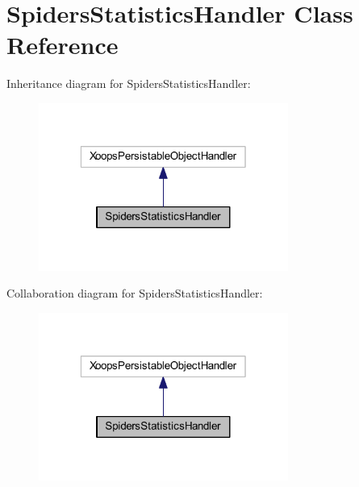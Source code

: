 \hypertarget{class_spiders_statistics_handler}{\section{Spiders\-Statistics\-Handler Class Reference}
\label{class_spiders_statistics_handler}
}


Inheritance diagram for Spiders\-Statistics\-Handler\-:
\nopagebreak
\begin{figure}[H]
\begin{center}
\leavevmode
\includegraphics[width=232pt]{class_spiders_statistics_handler__inherit__graph}
\end{center}
\end{figure}


Collaboration diagram for Spiders\-Statistics\-Handler\-:
\nopagebreak
\begin{figure}[H]
\begin{center}
\leavevmode
\includegraphics[width=232pt]{class_spiders_statistics_handler__coll__graph}
\end{center}
\end{figure}
